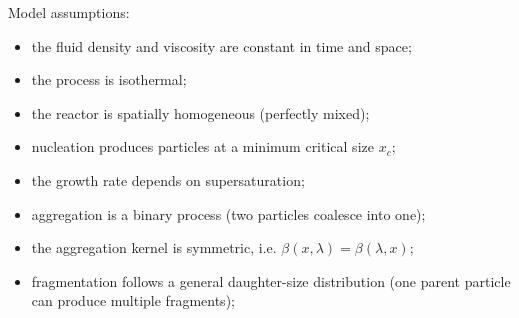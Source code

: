 \documentclass{article}
\begin{document}
Model assumptions:
\begin{itemize}
    \item the fluid density and viscosity are constant in time and space;
    \item the process is isothermal;
    \item the reactor is spatially homogeneous (perfectly mixed);
    \item nucleation produces particles at a minimum critical size $x_{c}$;
    \item the growth rate depends on supersaturation;
    \item aggregation is a binary process (two particles coalesce into one);
    \item the aggregation kernel is symmetric, i.e. $\beta(x, \lambda) = \beta(\lambda, x)$;
    \item fragmentation follows a general daughter-size distribution (one parent particle can produce multiple fragments);
\end{itemize}
\end{document}

